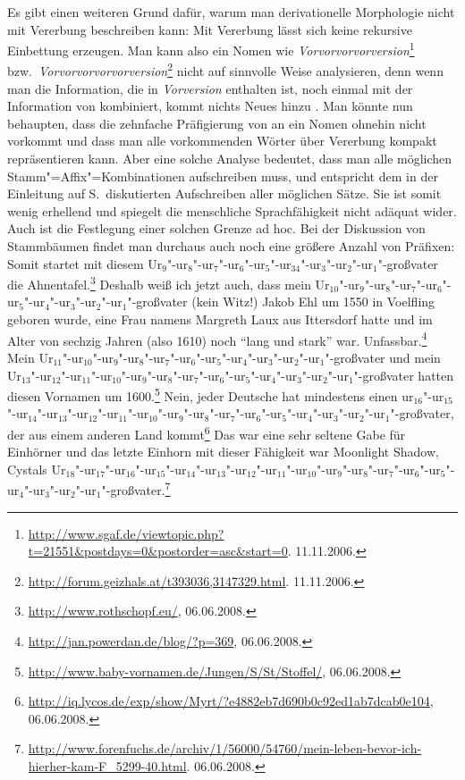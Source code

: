 Es gibt einen weiteren Grund dafür, warum man derivationelle Morphologie nicht mit Vererbung beschreiben kann:
Mit Vererbung lässt sich keine rekursive Einbettung erzeugen. Man kann also ein Nomen wie
\emph{Vorvorvorvorversion}\footnote{%
   \url{http://www.sgaf.de/viewtopic.php?t=21551&postdays=0&postorder=asc&start=0}. 11.11.2006.%
} bzw.\ \emph{Vorvorvorvorvorversion}\footnote{%
  \url{http://forum.geizhals.at/t393036,3147329.html}. 11.11.2006.%
}
nicht auf sinnvolle Weise analysieren, denn wenn man die Information, die in \emph{Vorversion} enthalten
ist, noch einmal mit der Information von  kombiniert, kommt nichts Neues hinzu
\citep[]{KN93a}.
Man könnte nun behaupten, dass die zehnfache Präfigierung von
 an ein Nomen ohnehin nicht vorkommt und dass man alle vorkommenden Wörter über Vererbung
kompakt repräsentieren kann. Aber eine solche Analyse bedeutet, dass
man alle möglichen Stamm"=Affix"=Kombinationen aufschreiben muss, und entspricht dem in der Einleitung 
auf S.\,\pageref{Seite-Alle-Sätze-aufschreiben}
diskutierten Aufschreiben aller möglichen Sätze. Sie ist somit wenig erhellend und spiegelt die
menschliche Sprachfähigkeit nicht adäquat wider. Auch ist die Festlegung einer solchen Grenze ad
hoc. Bei der Diskussion von Stammbäumen findet man durchaus auch noch eine größere Anzahl von
Präfixen:
\largerpage
\eal
\ex Somit startet mit diesem Ur$_9$"-ur$_8$"-ur$_7$"-ur$_6$"-ur$_5$"-ur$_34$"-ur$_3$"-ur$_2$"-ur$_1$"-großvater die Ahnentafel.\footnote{
  \url{http://www.rothschopf.eu/}, 06.06.2008.
}
\ex Deshalb weiß ich jetzt auch, dass mein Ur$_{10}$"-ur$_9$"-ur$_8$"-ur$_7$"-ur$_6$"-ur$_5$"-ur$_4$"-ur$_3$"-ur$_2$"-ur$_1$"-großvater (kein Witz!) Jakob Ehl um
1550 in Voelfling geboren wurde, eine Frau namens Margreth Laux aus Ittersdorf hatte und im Alter
von sechzig Jahren (also 1610) noch "`lang und stark"' war. Unfassbar.\footnote{
  \url{http://jan.powerdan.de/blog/?p=369}, 06.06.2008.
}
\ex Mein Ur$_{11}$"-ur$_{10}$"-ur$_9$"-ur$_8$"-ur$_7$"-ur$_6$"-ur$_5$"-ur$_4$"-ur$_3$"-ur$_2$"-ur$_1$"-großvater und mein Ur$_{13}$"-ur$_{12}$"-ur$_{11}$"-ur$_{10}$"-ur$_9$"-ur$_8$"-ur$_7$"-ur$_6$"-ur$_5$"-ur$_4$"-ur$_3$"-ur$_2$"-ur$_1$"-großvater hatten diesen
Vornamen um 1600.\footnote{
  \url{http://www.baby-vornamen.de/Jungen/S/St/Stoffel/}, 06.06.2008.
}
\ex Nein, jeder Deutsche hat mindestens einen
ur$_{16}$"-ur$_{15}$"-ur$_{14}$"-ur$_{13}$"-ur$_{12}$"-ur$_{11}$"-ur$_{10}$"-ur$_9$"-ur$_8$"-ur$_7$"-ur$_6$"-ur$_5$"-ur$_4$"-ur$_3$"-ur$_2$"-ur$_1$"-großvater,
der aus einem anderen Land kommt\footnote{
  \url{http://iq.lycos.de/exp/show/Myrt/?e4882eb7d690b0c92ed1ab7dcab0e104}, 06.06.2008.
}
\ex Das war eine sehr seltene Gabe für Einhörner und das letzte Einhorn mit dieser Fähigkeit war
Moonlight Shadow, Cystals Ur$_{18}$"-ur$_{17}$"-ur$_{16}$"-ur$_{15}$"-ur$_{14}$"-ur$_{13}$"-ur$_{12}$"-ur$_{11}$"-ur$_{10}$"-ur$_{9}$"-ur$_{8}$"-ur$_{7}$"-ur$_{6}$"-ur$_{5}$"-ur$_{4}$"-ur$_{3}$"-ur$_{2}$"-ur$_{1}$"-großvater.\footnote{
\url{http://www.forenfuchs.de/archiv/1/56000/54760/mein-leben-bevor-ich-hierher-kam-F_5299-40.html}.
06.06.2008.
}
\zl
{}%
%
%
%

